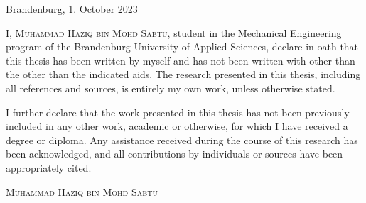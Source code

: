 \thispagestyle{empty}

\large
\begin{flushright}
  Brandenburg, 1. October 2023
\end{flushright}

\vspace*{40mm}
I, {\scshape Muhammad Haziq bin Mohd Sabtu}, student in the Mechanical Engineering program of the Brandenburg University of Applied Sciences, declare in oath that this thesis has been written by myself and has not been written with other than the other than the indicated aids. The research presented in this thesis, including all references and sources, is entirely my own work, unless otherwise stated.

I further declare that the work presented in this thesis has not been previously included in any other work, academic or otherwise, for which I have received a degree or diploma. Any assistance received during the course of this research has been acknowledged, and all contributions by individuals or sources have been appropriately cited.

\vspace*{40mm}

\begin{flushright}
  {\scshape Muhammad Haziq bin Mohd Sabtu}
\end{flushright}

\normalsize